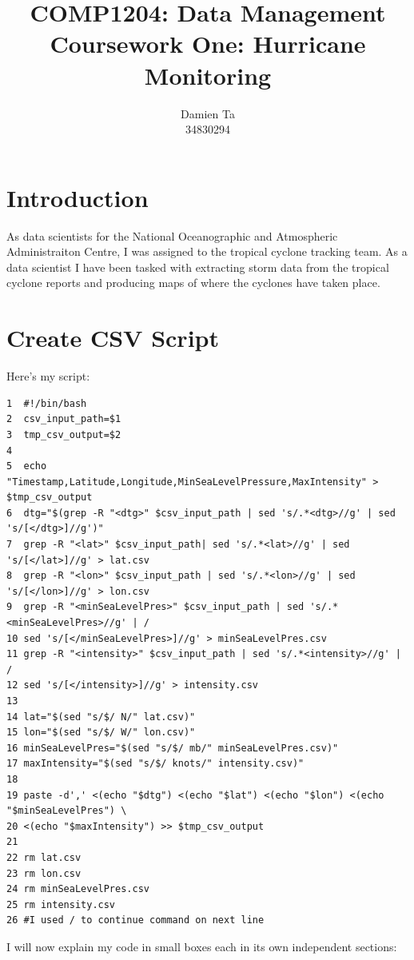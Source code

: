 \documentclass[]{article}
\title{COMP1204: Data Management \\ Coursework One: Hurricane Monitoring }
\author{Damien Ta \\ 34830294}
\begin{document}
\maketitle

\section{Introduction}
As data scientists for the National Oceanographic and Atmospheric Administraiton Centre, I was assigned to the tropical cyclone
tracking team. As a data scientist I have been tasked with extracting storm data from the tropical cyclone reports and producing
maps of where the cyclones have taken place.
\clearpage
\section{Create CSV Script}
Here's my script:
\begin{tcolorbox}[colback=white, colframe=black, boxrule=0.5pt, arc=2mm, 
    title=create\_csv.sh, width=6.7in, fonttitle=\bfseries, listing only, listing options={language=sh, basicstyle=\ttfamily}]
    \begin{verbatim}
1  #!/bin/bash
2  csv_input_path=$1
3  tmp_csv_output=$2
4
5  echo "Timestamp,Latitude,Longitude,MinSeaLevelPressure,MaxIntensity" > $tmp_csv_output
6  dtg="$(grep -R "<dtg>" $csv_input_path | sed 's/.*<dtg>//g' | sed 's/[</dtg>]//g')"
7  grep -R "<lat>" $csv_input_path| sed 's/.*<lat>//g' | sed 's/[</lat>]//g' > lat.csv
8  grep -R "<lon>" $csv_input_path | sed 's/.*<lon>//g' | sed 's/[</lon>]//g' > lon.csv
9  grep -R "<minSeaLevelPres>" $csv_input_path | sed 's/.*<minSeaLevelPres>//g' | /
10 sed 's/[</minSeaLevelPres>]//g' > minSeaLevelPres.csv
11 grep -R "<intensity>" $csv_input_path | sed 's/.*<intensity>//g' | / 
12 sed 's/[</intensity>]//g' > intensity.csv
13 
14 lat="$(sed "s/$/ N/" lat.csv)"
15 lon="$(sed "s/$/ W/" lon.csv)"
16 minSeaLevelPres="$(sed "s/$/ mb/" minSeaLevelPres.csv)"
17 maxIntensity="$(sed "s/$/ knots/" intensity.csv)"
18
19 paste -d',' <(echo "$dtg") <(echo "$lat") <(echo "$lon") <(echo "$minSeaLevelPres") \
20 <(echo "$maxIntensity") >> $tmp_csv_output
21
22 rm lat.csv
23 rm lon.csv
24 rm minSeaLevelPres.csv
25 rm intensity.csv
26 #I used / to continue command on next line
    \end{verbatim}
\end{tcolorbox}
I will now explain my code in small boxes each in its own independent sections:
\end{document}
